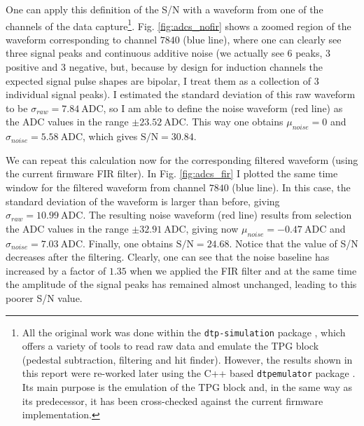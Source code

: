 One can apply this definition of the S/N with a waveform from one of the channels of the data capture\footnote{All the original work was done within the \texttt{dtp-simulation} package \cite{dtp-simulation}, which offers a variety of tools to read raw data and emulate the TPG block (pedestal subtraction, filtering and hit finder). However, the results shown in this report were re-worked later using the C++ based \texttt{dtpemulator} package \cite{dtpemulator}. Its main purpose is the emulation of the TPG block and, in the same way as its predecessor, it has been cross-checked against the current firmware implementation.}. Fig. \ref{fig:adcs_nofir} shows a zoomed region of the waveform corresponding to channel $7840$ (blue line), where one can clearly see three signal peaks and continuous additive noise (we actually see 6 peaks, 3 positive and 3 negative, but, because by design for induction channels the expected signal pulse shapes are bipolar, I treat them as a collection of 3 individual signal peaks). I estimated the standard deviation of this raw waveform to be $\sigma_{raw} = 7.84 \ \mathrm{ADC}$, so I am able to define the noise waveform (red line) as the ADC values in the range $\pm 23.52 \ \mathrm{ADC}$. This way one obtains $\mu_{noise} = 0$ and $\sigma_{noise} = 5.58 \ \mathrm{ADC}$, which gives $\mathrm{S/N} = 30.84$.

We can repeat this calculation now for the corresponding filtered waveform (using the current firmware FIR filter). In Fig. \ref{fig:adcs_fir} I plotted the same time window for the filtered waveform from channel $7840$ (blue line). In this case, the standard deviation of the waveform is larger than before, giving $\sigma_{raw} = 10.99 \ \mathrm{ADC}$. The resulting noise waveform (red line) results from selection the ADC values in the range $\pm 32.91 \ \mathrm{ADC}$, giving now $\mu_{noise} = -0.47 \ \mathrm{ADC}$ and $\sigma_{noise} = 7.03 \ \mathrm{ADC}$. Finally, one obtains $\mathrm{S/N} = 24.68$. Notice that the value of S/N decreases after the filtering. Clearly, one can see that the noise baseline has increased by a factor of $1.35$ when we applied the FIR filter and at the same time the amplitude of the signal peaks has remained almost unchanged, leading to this poorer S/N value.

